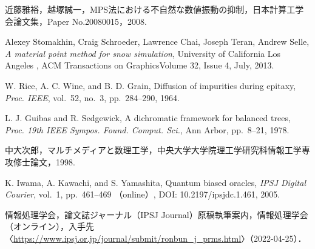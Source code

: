 \documentclass[a4j,12pt]{jreport}
\begin{document}
\begin{thebibliography}{99}

近藤雅裕，越塚誠一，MPS法における不自然な数値振動の抑制，日本計算工学会論文集，Paper No.20080015，2008. 

Alexey Stomakhin, Craig Schroeder, Lawrence Chai, Joseph Teran, Andrew Selle, \textit{A material point method for snow simulation}, University of California Los Angeles , ACM Transactions on GraphicsVolume 32, Issue 4, July, 2013.

W. Rice, A. C. Wine, and B. D. Grain, Diffusion of impurities during epitaxy, \textit{Proc. IEEE}, vol.~52, no.~3, pp.~284--290, 1964.

L. J. Guibas and R. Sedgewick, A dichromatic framework for balanced trees, 
\textit{Proc. 19th IEEE Sympos. Found. Comput. Sci.}, Ann Arbor, pp.~8--21, 1978.

中大次郎，マルチメディアと数理工学，中央大学大学院理工学研究科情報工学専攻修士論文，1998.

K. Iwama, A. Kawachi, and S. Yamashita, Quantum biased oracles, \textit{IPSJ Digital Courier}, vol.~1, pp.~461--469 （online）, DOI: 10.2197/ipsjdc.1.461, 2005.

情報処理学会，論文誌ジャーナル（IPSJ Journal）原稿執筆案内，情報処理学会（オンライン），入手先〈\url{https://www.ipsj.or.jp/journal/submit/ronbun_j_prms.html}〉（2022-04-25）．


\end{thebibliography}

\end{document}
